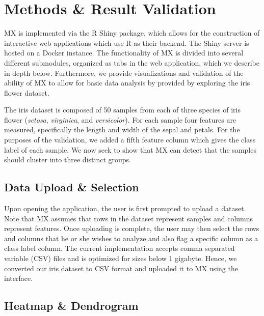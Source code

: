 \documentclass[twoside,leqno,twocolumn]{article}
\begin{document}
\section{Methods \& Result Validation}
\label{sec:meth}

MX is implemented via the R Shiny package, which allows for the construction of interactive web applications which use R as their backend. The Shiny server is hosted on a Docker instance. The functionality of MX is divided into several different submodules, organized as tabs in the web application, which we  describe in depth below. Furthermore, we provide visualizations and validation of the ability of MX to allow for basic data analysis by provided by exploring the iris flower dataset. 

The iris dataset is composed of 50 samples from each of three species of iris flower (\textit{setosa}, \textit{virginica}, and \textit{versicolor}). For each sample four features are measured, specifically the length and width of the sepal and petals. For the purposes of the validation, we added a fifth feature column which gives the class label of each sample. We now seek to show that MX can detect that the samples should cluster into three distinct groups.

\subsection{Data Upload \& Selection}
\label{subsec:SubSecUpload}

Upon opening the application, the user is first prompted to upload a dataset. Note that MX assumes that rows in the dataset represent samples and columns represent features. Once uploading is complete, the user may then select the rows and columns that he or she wishes to analyze and also flag a specific column as a class label column. The current implementation accepts comma separated variable (CSV) files and is optimized for sizes below 1 gigabyte. Hence, we converted our iris dataset to CSV format and uploaded it to MX using the interface.

\subsection{Heatmap \& Dendrogram}
\label{subsec:SubSecHeatmap}
\end{document}
